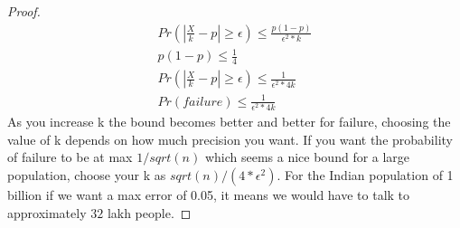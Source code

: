 \documentclass[solution,addpoints,12pt]{exam}
\begin{document}
\begin{questions}
\begin{solution}
\begin{proof}
\begin{align*}
  		 Pr(|\frac{X}{k} - p| \geq \epsilon) \leq \frac{p(1-p)}{\epsilon^2*k}
  		\\
  		p(1-p) \leq \frac{1}{4}
  		\\
  		Pr(|\frac{X}{k} - p| \geq \epsilon) \leq \frac{1}{\epsilon^2*4k}
  		\\
  		Pr(failure) \leq \frac{1}{\epsilon^2*4k}
  	\end{align*}
  	As you increase k the bound becomes better and better for failure, choosing the value of k depends on how much precision you want. If you want the probability of failure to be at max $1/sqrt(n)$ which seems a nice bound for a large population, choose your k as $sqrt(n)/(4*\epsilon^2)$. For the Indian population of 1 billion if we want a max error of 0.05, it means we would have to talk to approximately $32$ lakh people.
  \end{proof}
  \end{solution}
\end{questions}
\end{document}
